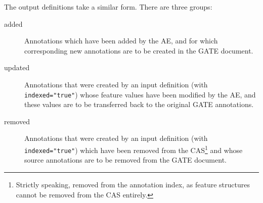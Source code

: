 
The output definitions take a similar form.  There are three groups:
\begin{description}
\item[added] Annotations which have been added by the AE, and for which
corresponding new annotations are to be created in the GATE document.
\item[updated] Annotations that were created by an input definition (with
\texttt{indexed="true"}) whose feature values have been modified by the AE,
and these values are to be transferred back to the original GATE annotations.
\item[removed] Annotations that were created by an input definition (with
\texttt{indexed="true"}) which have been removed from the CAS\footnote{Strictly
speaking, removed from the annotation index, as feature structures cannot be
removed from the CAS entirely.} and whose source annotations are to be removed
from the GATE document.
\end{description}

